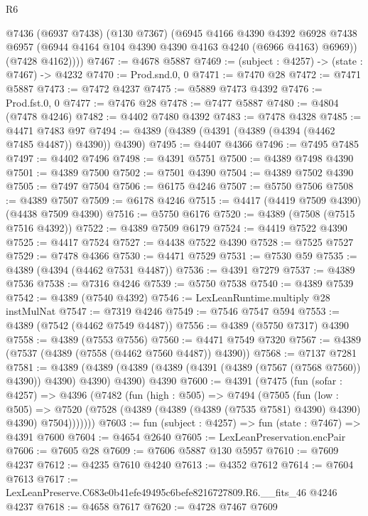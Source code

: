 \begin{lexlean}{R6}
\begin{coremodule}
        @7436
          (@6937 @7438)
          (@130 @7367)
          (@6945
            @4166
            @4390
            @4392
            @6928
            @7438
            @6957
            (@6944 @4164 @104 @4390 @4390 @4163 @4240 (@6966 @4163) @6969))
          (@7428 @4162))))
@7467 := @4678 @5887
@7469 := (subject : @4257) -> (state : @7467) -> @4232
@7470 := Prod.snd.{0, 0}
@7471 := @7470 @28
@7472 := @7471 @5887
@7473 := @7472 @4237
@7475 := @5889 @7473 @4392
@7476 := Prod.fst.{0, 0}
@7477 := @7476 @28
@7478 := @7477 @5887
@7480 := @4804 (@7478 @4246)
@7482 := @4402 @7480 @4392
@7483 := @7478 @4328
@7485 := @4471 @7483 @97
@7494 := @4389 (@4389 (@4391 (@4389 (@4394 (@4462 @7485 @4487)) @4390)) @4390)
@7495 := @4407 @4366
@7496 := @7495 @7485
@7497 := @4402 @7496
@7498 := @4391 @5751
@7500 := @4389 @7498 @4390
@7501 := @4389 @7500
@7502 := @7501 @4390
@7504 := @4389 @7502 @4390
@7505 := @7497 @7504
@7506 := @6175 @4246
@7507 := @5750 @7506
@7508 := @4389 @7507
@7509 := @6178 @4246
@7515 := @4417 (@4419 @7509 @4390) (@4438 @7509 @4390)
@7516 := @5750 @6176
@7520 := @4389 (@7508 (@7515 @7516 @4392))
@7522 := @4389 @7509 @6179
@7524 := @4419 @7522 @4390
@7525 := @4417 @7524
@7527 := @4438 @7522 @4390
@7528 := @7525 @7527
@7529 := @7478 @4366
@7530 := @4471 @7529
@7531 := @7530 @59
@7535 := @4389 (@4394 (@4462 @7531 @4487))
@7536 := @4391 @7279
@7537 := @4389 @7536
@7538 := @7316 @4246
@7539 := @5750 @7538
@7540 := @4389 @7539
@7542 := @4389 (@7540 @4392)
@7546 := LexLeanRuntime.multiply @28 instMulNat
@7547 := @7319 @4246
@7549 := @7546 @7547 @594
@7553 := @4389 (@7542 (@4462 @7549 @4487))
@7556 := @4389 (@5750 @7317) @4390
@7558 := @4389 (@7553 @7556)
@7560 := @4471 @7549 @7320
@7567 := @4389 (@7537 (@4389 (@7558 (@4462 @7560 @4487)) @4390))
@7568 := @7137 @7281
@7581 := @4389
    (@4389 (@4389 (@4389 (@4391 (@4389 (@7567 (@7568 @7560)) @4390)) @4390) @4390) @4390)
    @4390
@7600 := @4391
    (@7475
      (fun (sofar : @4257) =>
      @4396
        (@7482
          (fun (high : @505) =>
          @7494
            (@7505
              (fun (low : @505) =>
              @7520 (@7528 (@4389 (@4389 (@4389 (@7535 @7581) @4390) @4390) @4390) @7504)))))))
@7603 := fun (subject : @4257) => fun (state : @7467) => @4391 @7600
@7604 := @4654 @2640
@7605 := LexLeanPreservation.encPair
@7606 := @7605 @28
@7609 := @7606 @5887 @130 @5957
@7610 := @7609 @4237
@7612 := @4235 @7610 @4240
@7613 := @4352 @7612
@7614 := @7604 @7613
@7617 := LexLeanPreserve.C683e0b41efe49495c6befe8216727809.R6.__fits_46 @4246 @4237
@7618 := @4658 @7617
@7620 := @4728 @7467 @7609

\end{coremodule}
\end{lexlean}
